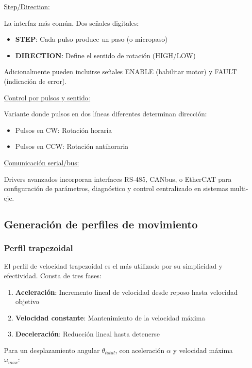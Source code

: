 \underline{Step/Direction:}

La interfaz más común. Dos señales digitales:
\begin{itemize}
    \item \textbf{STEP}: Cada pulso produce un paso (o micropaso)
    \item \textbf{DIRECTION}: Define el sentido de rotación (HIGH/LOW)
\end{itemize}

Adicionalmente pueden incluirse señales ENABLE (habilitar motor) y FAULT (indicación de error).

\underline{Control por pulsos y sentido:}

Variante donde pulsos en dos líneas diferentes determinan dirección:
\begin{itemize}
    \item Pulsos en CW: Rotación horaria
    \item Pulsos en CCW: Rotación antihoraria
\end{itemize}

\underline{Comunicación serial/bus:}

Drivers avanzados incorporan interfaces RS-485, CANbus, o EtherCAT para configuración de parámetros, diagnóstico y control centralizado en sistemas multi-eje.

\subsection{Generación de perfiles de movimiento}

\subsubsection{Perfil trapezoidal}

El perfil de velocidad trapezoidal es el más utilizado por su simplicidad y efectividad. Consta de tres fases:

\begin{enumerate}
    \item \textbf{Aceleración}: Incremento lineal de velocidad desde reposo hasta velocidad objetivo
    \item \textbf{Velocidad constante}: Mantenimiento de la velocidad máxima
    \item \textbf{Deceleración}: Reducción lineal hasta detenerse
\end{enumerate}

Para un desplazamiento angular $\theta_{total}$, con aceleración $\alpha$ y velocidad máxima $\omega_{max}$:

